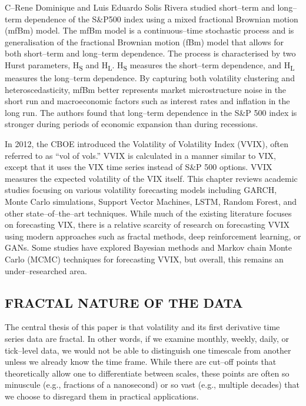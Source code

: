 \documentclass[12pt,a4paper]{report}
\numberwithin{equation}{section}
\begin{document}
C--Rene Dominique and Luis Eduardo Solis Rivera \cite{solis2011mixed_12} studied
short--term and long--term dependence of the S\&P500 index using a mixed
fractional Brownian motion (mfBm) model. The mfBm model is a
continuous--time stochastic process and is generalisation of the
fractional Brownian motion (fBm) model that allows for both short--term
and long--term dependence. The process is characterised by two Hurst
parameters, H\textsubscript{S} and H\textsubscript{L}.
H\textsubscript{S} measures the short--term dependence, and
H\textsubscript{L} measures the long--term dependence. By capturing both
volatility clustering and heteroscedasticity, mfBm better represents
market microstructure noise in the short run and macroeconomic factors
such as interest rates and inflation in the long run. The authors found
that long--term dependence in the S\&P 500 index is stronger during
periods of economic expansion than during recessions.

In 2012, the CBOE introduced the Volatility of Volatility Index (VVIX),
often referred to as ``vol of vols.'' VVIX is calculated in a manner
similar to VIX, except that it uses the VIX time series instead of S\&P
500 options. VVIX measures the expected volatility of the VIX itself.
This chapter reviews academic studies focusing on various volatility
forecasting models including GARCH, Monte Carlo simulations, Support
Vector Machines, LSTM, Random Forest, and other state--of--the--art
techniques. While much of the existing literature focuses on forecasting
VIX, there is a relative scarcity of research on forecasting VVIX using
modern approaches such as fractal methods, deep reinforcement learning,
or GANs. Some studies have explored Bayesian methods and Markov chain
Monte Carlo (MCMC) techniques for forecasting VVIX, but overall, this
remains an under--researched area.

\hypertarget{fractal--nature--of--the--data}{%
\subsection{FRACTAL NATURE OF THE
DATA}\label{fractal--nature--of--the--data}}

The central thesis of this paper is that volatility and its first
derivative time series data are fractal. In other words, if we examine
monthly, weekly, daily, or tick--level data, we would not be able to
distinguish one timescale from another unless we already know the time
frame. While there are cut--off points that theoretically allow one to
differentiate between scales, these points are often so minuscule (e.g.,
fractions of a nanosecond) or so vast (e.g., multiple decades) that we
choose to disregard them in practical applications.
\end{document}
